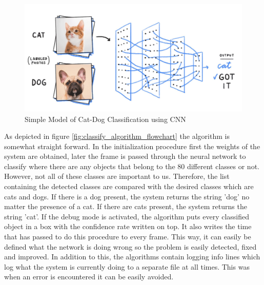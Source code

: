 \begin{figure}[h!]
    \centering
    \includegraphics[width=1\linewidth]{content/010_introduction/img/cat_dog_class.jpg}
    \caption{Simple Model of Cat-Dog Classification using CNN  \cite{cite:modelCNN}}
    \label{fig:CNNmodel}
\end{figure}

As depicted in figure \ref{fig:classify_algorithm_flowchart} the algorithm is somewhat straight forward. In the initialization procedure first the weights of the system are obtained, later the frame is passed through the neural network to classify where there are any objects that belong to the 80 different classes or not. However, not all of these classes are important to us. Therefore, the list containing the detected classes are compared with the desired classes which are cats and dogs. If there is a dog present, the system returns the string 'dog' no matter the presence of a cat. If there are cats present, the system returns the string 'cat'. If the debug mode is activated, the algorithm puts every classified object in a box with the confidence rate written on top. It also writes the time that has passed to do this procedure to every frame. This way, it can easily be defined what the network is doing wrong so the problem is easily detected, fixed and improved. In addition to this, the algorithms contain logging info lines which log what the system is currently doing to a separate file at all times. This was when an error is encountered it can be easily avoided. 

